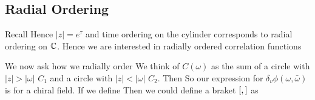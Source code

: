 \documentclass{article}
\begin{document}
\subsection{Radial Ordering}
Recall 
Hence $|z| = e^\tau$ and time ordering on the cylinder corresponds to radial ordering on $\mathbb{C}$. Hence we are interested in radially ordered correlation functions 
\begin{definition}
\end{definition}
We now ask how we radially order 
We think of $C(\omega)$ as the sum of a circle with $|z| > |\omega|$ $C_1$ and a circle with $|z| < |\omega|$ $C_2$. Then 
So our expression for $\delta_v \phi(\omega,\bar{\omega})$ is 
for a chiral field. If we define 
Then we could define a braket $\left[ ,  \right]$ as 
\end{document}
